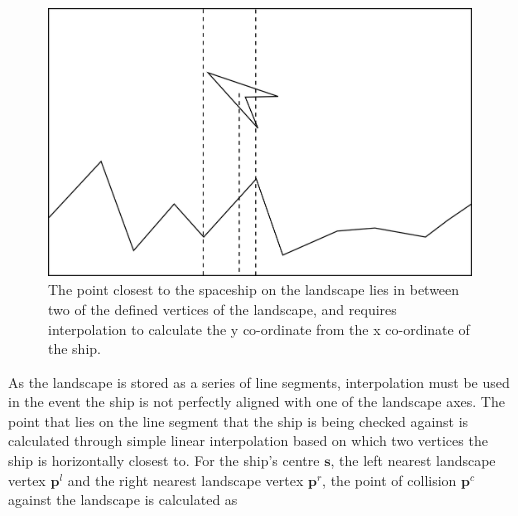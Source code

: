 \documentclass[conference]{IEEEtran}
\begin{document}
\begin{figure}[hbtp]
\centering
\includegraphics[scale=0.4]{graphics/landscapepoint}
\caption{The point closest to the spaceship on the landscape lies in between two of the defined vertices of the landscape, and requires interpolation to calculate the y co-ordinate from the x co-ordinate of the ship.}
\label{fig:diagram_landscapepoint}
\end{figure}

As the landscape is stored as a series of line segments, interpolation must be used in the event the ship is not perfectly aligned with one of the landscape axes. The point that lies on the line segment that the ship is being checked against is calculated through simple linear interpolation based on which two vertices the ship is horizontally closest to. For the ship's centre $\boldsymbol {s}$, the left nearest landscape vertex $\boldsymbol {p}^{l}$ and the right nearest landscape vertex $\boldsymbol {p}^{r}$, the point of collision $\boldsymbol {p}^{c}$ against the landscape is calculated as 

\end{document}
